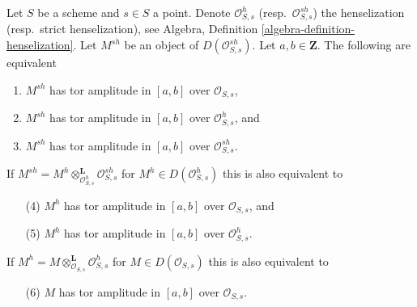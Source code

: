 \begin{lemma}
\label{lemma-tor-amplitude-up-down-henselization}
Let $S$ be a scheme and $s \in S$ a point. Denote $\mathcal{O}_{S, s}^h$
(resp.\ $\mathcal{O}_{S, s}^{sh}$) the henselization (resp.\ strict
henselization), see
Algebra, Definition \ref{algebra-definition-henselization}.
Let $M^{sh}$ be an object of $D(\mathcal{O}_{S, s}^{sh})$.
Let $a, b \in \mathbf{Z}$.
The following are equivalent
\begin{enumerate}
\item $M^{sh}$ has tor amplitude in $[a, b]$ over $\mathcal{O}_{S, s}$,
\item $M^{sh}$ has tor amplitude in $[a, b]$ over $\mathcal{O}_{S, s}^h$, and
\item $M^{sh}$ has tor amplitude in $[a, b]$ over $\mathcal{O}_{S, s}^{sh}$.
\end{enumerate}
If $M^{sh} =
M^h \otimes_{\mathcal{O}_{S, s}^h}^\mathbf{L} \mathcal{O}_{S, s}^{sh}$
for $M^h \in D(\mathcal{O}_{S, s}^h)$ this is also equivalent to
\begin{enumerate}
\item[(4)] $M^h$ has tor amplitude in $[a, b]$ over $\mathcal{O}_{S, s}$, and
\item[(5)] $M^h$ has tor amplitude in $[a, b]$ over $\mathcal{O}_{S, s}^h$.
\end{enumerate}
If $M^h = M \otimes_{\mathcal{O}_{S, s}}^\mathbf{L} \mathcal{O}_{S, s}^h$
for $M \in D(\mathcal{O}_{S, s})$
this is also equivalent to
\begin{enumerate}
\item[(6)] $M$ has tor amplitude in $[a, b]$ over $\mathcal{O}_{S, s}$.
\end{enumerate}
\end{lemma}

